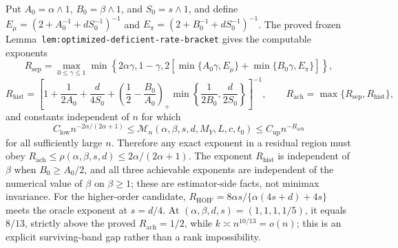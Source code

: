 Put \(A_0=\alpha\wedge1\), \(B_0=\beta\wedge1\), and \(S_0=s\wedge1\), and define \(E_\mu=(2+A_0^{-1}+dS_0^{-1})^{-1}\) and \(E_\pi=(2+B_0^{-1}+dS_0^{-1})^{-1}\). The proved frozen Lemma~\texttt{lem:optimized-deficient-rate-bracket} gives the computable exponents
\[
R_{\mathrm{sep}}=\max_{0\le\gamma\le1}\min\left\{2\alpha\gamma,1-\gamma,2\left[\min\{A_0\gamma,E_\mu\}+\min\{B_0\gamma,E_\pi\}\right]\right\},
\]
\[
R_{\mathrm{hist}}=\left[1+\frac1{2A_0}+\frac d{4S_0}+\left(\frac12-\frac{B_0}{A_0}\right)_+\min\left\{\frac1{2B_0},\frac d{2S_0}\right\}\right]^{-1},
\qquad R_{\mathrm{ach}}=\max\{R_{\mathrm{sep}},R_{\mathrm{hist}}\},
\]
and constants independent of \(n\) for which
\[
C_{\mathrm{low}}n^{-2\alpha/(2\alpha+1)}\le \mathcal M_n(\alpha,\beta,s,d,M_Y,L,c,t_0)\le C_{\mathrm{up}}n^{-R_{\mathrm{ach}}}
\]
for all sufficiently large \(n\). Therefore any exact exponent in a residual region must obey \(R_{\mathrm{ach}}\le\rho(\alpha,\beta,s,d)\le2\alpha/(2\alpha+1)\). The exponent \(R_{\mathrm{hist}}\) is independent of \(\beta\) when \(B_0\ge A_0/2\), and all three achievable exponents are independent of the numerical value of \(\beta\) on \(\beta\ge1\); these are estimator-side facts, not minimax invariance. For the higher-order candidate, \(R_{\mathrm{HOIF}}=8\alpha s/\{\alpha(4s+d)+4s\}\) meets the oracle exponent at \(s=d/4\). At \((\alpha,\beta,d,s)=(1,1,1,1/5)\), it equals \(8/13\), strictly above the proved \(R_{\mathrm{ach}}=1/2\), while \(k\asymp n^{10/13}=o(n)\); this is an explicit surviving-band gap rather than a rank impossibility.